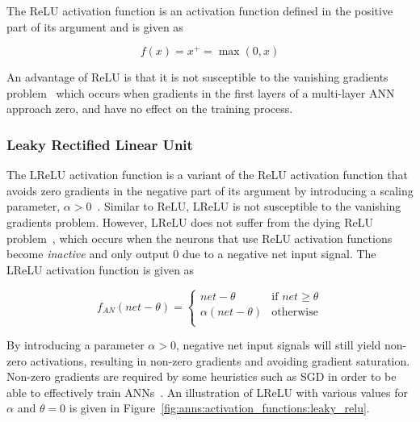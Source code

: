 The \acf{ReLU} activation function is an activation function defined in the positive part of its argument and is given as

\begin{equation}
      f(x) = x^{+} = \max(0,x)
      \label{eq:relu}
\end{equation}

An advantage of \acs{ReLU} is that it is not susceptible to the vanishing gradients problem~\cite{ref:xu:2015, ref:maksutov:2018} which occurs when gradients in the first layers of a multi-layer \acs{ANN} approach zero, and have no effect on the training process.


\subsubsection{Leaky Rectified Linear Unit}\label{sec:anns:an:act_functions:leaky_relu}

The \acf{LReLU} activation function is a variant of the \acs{ReLU} activation function that avoids zero gradients in the negative part of its argument by introducing a scaling parameter, $\alpha > 0$~\cite{ref:xu:2015}. Similar to \acs{ReLU}, \acs{LReLU} is not susceptible to the vanishing gradients problem. However, \acs{LReLU} does not suffer from the dying \acs{ReLU} problem~\cite{ref:agarap:2018}, which occurs when the neurons that use \acs{ReLU} activation functions become \textit{inactive} and only output $0$ due to a negative net input signal. The \acs{LReLU} activation function is given as

\begin{equation}
      f_{AN}(net - \theta) =
      \begin{cases}
            net - \theta         & \text{if $net \geq \theta $} \\
            \alpha(net - \theta) & \text{otherwise}             \\
      \end{cases}
      \label{eq:leaky_relu}
\end{equation}

By introducing a parameter $\alpha > 0$, negative net input signals will still yield non-zero activations, resulting in non-zero gradients and avoiding gradient saturation. Non-zero gradients are required by some heuristics such as \acs{SGD} in order to be able to effectively train \acp{ANN}~\cite{ref:hanin:2018}. An illustration of \acs{LReLU} with various values for $\alpha$ and $\theta = 0$ is given in Figure~\ref{fig:anns:activation_functions:leaky_relu}.

